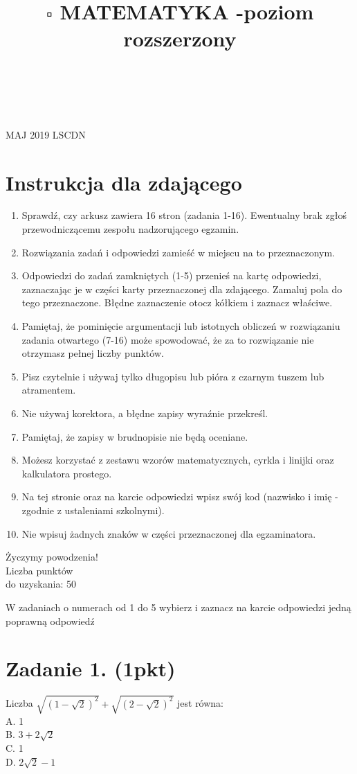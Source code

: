\documentclass[10pt]{article}
\title{\(\square\) MATEMATYKA -poziom rozszerzony }
\author{}
\date{}
\begin{document}
\maketitle
\(\qquad\)\\
\(\qquad\)

MAJ 2019 LSCDN

\section*{Instrukcja dla zdającego}
\begin{enumerate}
  \item Sprawdź, czy arkusz zawiera 16 stron (zadania 1-16). Ewentualny brak zgłoś przewodniczącemu zespołu nadzorującego egzamin.
  \item Rozwiązania zadań i odpowiedzi zamieść w miejscu na to przeznaczonym.
  \item Odpowiedzi do zadań zamkniętych (1-5) przenieś na kartę odpowiedzi, zaznaczając je w części karty przeznaczonej dla zdającego. Zamaluj pola do tego przeznaczone. Błędne zaznaczenie otocz kółkiem i zaznacz właściwe.
  \item Pamiętaj, że pominięcie argumentacji lub istotnych obliczeń w rozwiązaniu zadania otwartego (7-16) może spowodować, że za to rozwiązanie nie otrzymasz pełnej liczby punktów.
  \item Pisz czytelnie i używaj tylko długopisu lub pióra z czarnym tuszem lub atramentem.
  \item Nie używaj korektora, a błędne zapisy wyraźnie przekreśl.
  \item Pamiętaj, że zapisy w brudnopisie nie będą oceniane.
  \item Możesz korzystać z zestawu wzorów matematycznych, cyrkla i linijki oraz kalkulatora prostego.
  \item Na tej stronie oraz na karcie odpowiedzi wpisz swój kod (nazwisko i imię - zgodnie z ustaleniami szkolnymi).
  \item Nie wpisuj żadnych znaków w części przeznaczonej dla egzaminatora.
\end{enumerate}

Życzymy powodzenia!\\
Liczba punktów\\
do uzyskania: 50

W zadaniach o numerach od 1 do 5 wybierz i zaznacz na karcie odpowiedzi jedną poprawną odpowiedź

\section*{Zadanie 1. (1pkt)}
Liczba \(\sqrt{(1-\sqrt{2})^{2}}+\sqrt{(2-\sqrt{2})^{2}}\) jest równa:\\
A. 1\\
B. \(3+2 \sqrt{2}\)\\
C. 1\\
D. \(2 \sqrt{2}-1\)
\end{document}
